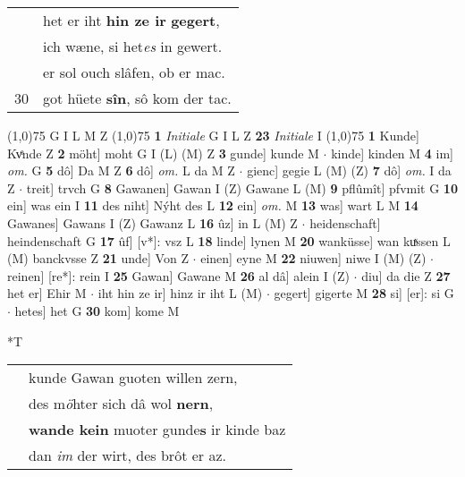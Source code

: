 \documentclass[8pt,a4paper,notitlepage]{article}
\begin{document}
\begin{table}[ht]
\begin{minipage}[t]{0.5\linewidth}
\begin{tabular}{rl}
 & het er iht \textbf{hin ze ir} \textbf{gegert},\\ 
 & ich wæne, si het\textit{es} in gewert.\\ 
 & er sol ouch slâfen, ob er mac.\\ 
30 & got hüete \textbf{sîn}, sô kom der tac.\\ 
\end{tabular}
\scriptsize
\line(1,0){75} \newline
G I L M Z \newline
\line(1,0){75} \newline
\textbf{1} \textit{Initiale} G I L Z  \textbf{23} \textit{Initiale} I  \newline
\line(1,0){75} \newline
\textbf{1} Kunde] Kvͤnde Z \textbf{2} möht] moht G I (L) (M) Z \textbf{3} gunde] kunde M  $\cdot$ kinde] kinden M \textbf{4} im] \textit{om.} G \textbf{5} dô] Da M Z \textbf{6} dô] \textit{om.} L da M Z  $\cdot$ gienc] gegie L (M) (Z) \textbf{7} dô] \textit{om.} I da Z  $\cdot$ treit] trvch G \textbf{8} Gawanen] Gawan I (Z) Gawane L (M) \textbf{9} pflûmît] pfvmit G \textbf{10} ein] was ein I \textbf{11} des niht] Nýht des L \textbf{12} ein] \textit{om.} M \textbf{13} was] wart L M \textbf{14} Gawanes] Gawans I (Z) Gawanz L \textbf{16} ûz] in L (M) Z  $\cdot$ heidenschaft] heindenschaft G \textbf{17} ûf] [v*]: vsz L \textbf{18} linde] lynen M \textbf{20} wanküsse] wan kuͯssen L (M) banckvsse Z \textbf{21} unde] Von Z  $\cdot$ einen] eyne M \textbf{22} niuwen] niwe I (M) (Z)  $\cdot$ reinen] [re*]: rein I \textbf{25} Gawan] Gawane M \textbf{26} al dâ] alein I (Z)  $\cdot$ diu] da die Z \textbf{27} het er] Ehir M  $\cdot$ iht hin ze ir] hinz ir iht L (M)  $\cdot$ gegert] gigerte M \textbf{28} si] [er]: si G  $\cdot$ hetes] het G \textbf{30} kom] kome M \newline
\end{minipage}
\hspace{0.5cm}
\begin{minipage}[t]{0.5\linewidth}
\small
\begin{center}*T
\end{center}
\begin{tabular}{rl}
 & kunde Gawan guoten willen zern,\\ 
 & des m\textit{ö}hter sich dâ wol \textbf{nern},\\ 
 & \textbf{wande kein} muoter gunde\textbf{s} ir kinde baz\\ 
 & dan \textit{im} der wirt, des brôt er az.\\ 

\end{tabular}
\end{minipage}
\end{table}
\end{document}

